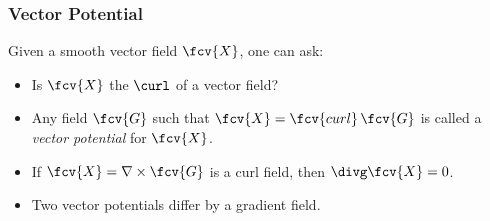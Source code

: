\begin{frame}
  \frametitle{Vector Potential}

  Given a smooth vector field $\fcv{X}$, one can ask:
%
\begin{itemize}
  \item Is $\fcv{X}$ the $\curl$ of a vector field?
  \item  Any field $\fcv{G}$ such that $\fcv{X} = \fcv{curl}\, \fcv{G}$ is called a \emph{vector potential} for $\fcv{X}$.
  \item If $\fcv{X}=\nabla \times \fcv{G}$ is a curl field, then $\divg \fcv{X} = 0$.
  \item Two vector potentials differ by a gradient field.
\end{itemize}


\end{frame}